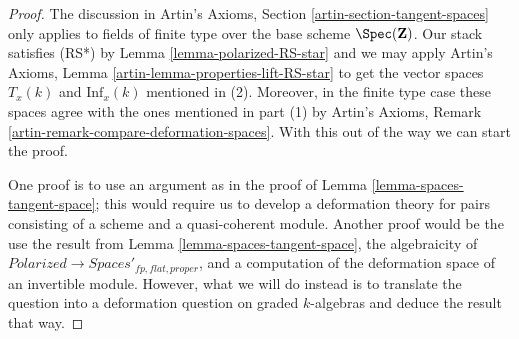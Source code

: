 \begin{proof}
The discussion in Artin's Axioms, Section \ref{artin-section-tangent-spaces}
only applies to fields of finite type over the base scheme $\Spec(\mathbf{Z})$.
Our stack satisfies (RS*) by Lemma \ref{lemma-polarized-RS-star}
and we may apply
Artin's Axioms, Lemma \ref{artin-lemma-properties-lift-RS-star}
to get the vector spaces $T_x(k)$ and $\text{Inf}_x(k)$
mentioned in (2). Moreover, in the finite type case these spaces agree with the
ones mentioned in part (1)
by Artin's Axioms, Remark \ref{artin-remark-compare-deformation-spaces}.
With this out of the way we can start the proof.

\medskip\noindent
One proof is to use an argument as in the proof of
Lemma \ref{lemma-spaces-tangent-space}; this would
require us to develop a deformation theory for pairs
consisting of a scheme and a quasi-coherent module.
Another proof would be the use the result from
Lemma \ref{lemma-spaces-tangent-space},
the algebraicity of
$\textit{Polarized} \to \textit{Spaces}'_{fp, flat, proper}$,
and a computation of the deformation space of an
invertible module. However, what we will do instead
is to translate the question into a deformation question
on graded $k$-algebras and deduce the result that way.


\end{proof}
